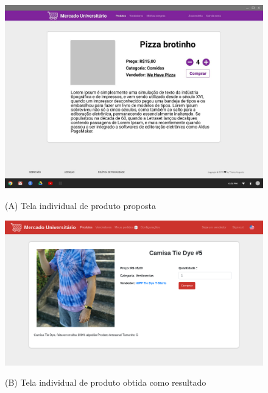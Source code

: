 \begin{figure}[htbp!]
  \centering
  \caption{(A) Tela individual de produto proposta}
  \includegraphics[width=1\textwidth]{figs/mockup/produto.jpg}
    \label{fig:err}
\end{figure}

\begin{figure}[htbp!]
  \centering
  \caption{(B) Tela individual de produto obtida como resultado}
  \includegraphics[width=1\textwidth]{figs/resultado/produto.png}
    \label{fig:err}
\end{figure}

